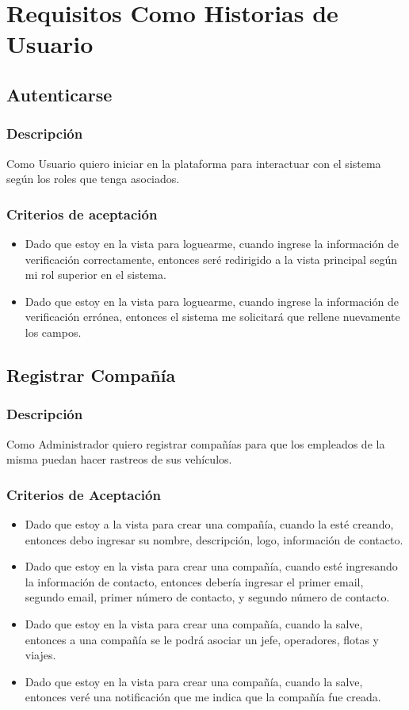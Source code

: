 \documentclass{article}
\begin{document}
\section{Requisitos Como Historias de Usuario}
\subsection{Autenticarse}
\subsubsection{Descripción}
Como Usuario quiero iniciar en la plataforma para interactuar con el sistema según los roles que tenga asociados.
\subsubsection{Criterios de aceptación}
\begin{itemize}
    \item Dado que estoy en la vista para loguearme, cuando ingrese la información de verificación correctamente, entonces seré redirigido a la vista principal según mi rol superior en el sistema.
    \item Dado que estoy en la vista para loguearme, cuando ingrese la información de verificación errónea, entonces el sistema me solicitará que rellene nuevamente los campos.
\end{itemize}

\subsection{Registrar Compañía}
\subsubsection{Descripción} 
Como Administrador quiero registrar compañías para que los empleados de la misma puedan hacer rastreos de sus vehículos.
\subsubsection{Criterios de Aceptación} 
\begin{itemize}
    \item Dado que estoy a la vista para crear una compañía, cuando la esté creando, entonces debo ingresar su nombre, descripción, logo, información de contacto.
    \item Dado que estoy en la vista para crear una compañía, cuando esté ingresando la información de contacto, entonces debería ingresar el primer email, segundo email, primer número de contacto, y segundo número de contacto.
    \item Dado que estoy en la vista para crear una compañía, cuando la salve, entonces a una compañía se le podrá asociar un jefe, operadores, flotas y viajes.
    \item Dado que estoy en la vista para crear una compañía, cuando la salve, entonces veré una notificación que me indica que la compañía fue creada.
\end{itemize}
\end{document}
